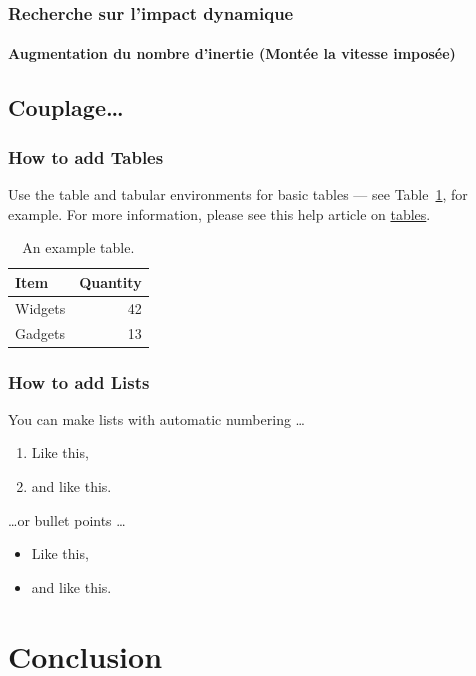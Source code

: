 \documentclass[a4paper,12pt]{report}
\begin{document}
\subsection{Recherche sur l'impact dynamique}

\subsubsection{Augmentation du nombre d'inertie (Montée la vitesse imposée)}


\section{Couplage\ldots}
\subsection{How to add Tables}

Use the table and tabular environments for basic tables --- see Table~\ref{tab:widgets}, for example. For more information, please see this help article on \href{https://www.overleaf.com/learn/latex/tables}{tables}. 

\begin{table}
\centering
\begin{tabular}{l|r}
Item & Quantity \\\hline
Widgets & 42 \\
Gadgets & 13
\end{tabular}
\caption{\label{tab:widgets}An example table.}
\end{table}

\subsection{How to add Lists}

You can make lists with automatic numbering \dots

\begin{enumerate}
\item Like this,
\item and like this.
\end{enumerate}
\dots or bullet points \dots
\begin{itemize}
\item Like this,
\item and like this.
\end{itemize}
\chapter{Conclusion}
\end{document}
